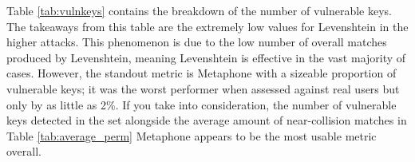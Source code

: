 
\begin{table}[!h]
    \centering

    \caption{Number of vulnerable keys per metric}
    \label{tab:vulnkeys}
\end{table}

Table \ref{tab:vulnkeys} contains the breakdown of the number of vulnerable keys. The takeaways from this table are the extremely low values for Levenshtein in the higher attacks. This phenomenon is due to the low number of overall matches produced by Levenshtein, meaning Levenshtein is effective in the vast majority of cases. However, the standout metric is Metaphone with a sizeable proportion of vulnerable keys; it was the worst performer when assessed against real users but only by as little as 2\%. If you take into consideration, the number of vulnerable keys detected in the set alongside the average amount of near-collision matches in Table \ref{tab:average_perm} Metaphone appears to be the most usable metric overall.

